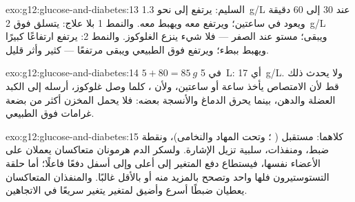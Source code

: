\begin{solution}{exo:g12:glucose-and-diabetes:13}
السليم: يرتفع  إلى نحو \qty{1.3}{g/L} عند 30 إلى 60 دقيقة
ويعود في ساعتين؛ ويرتفع  معه ويهبط معه. والنمط 1 بلا علاج:
يتسلق  فوق \qty{2}{g/L} ويبقى؛  مستو عند الصفر ---
فلا شيء ينزع الغلوكوز. والنمط 2: يرتفع  ارتفاعًا كبيرًا ويهبط
ببطء؛ ويرتفع  فوق الطبيعي ويبقى مرتفعًا ---  كثير وأثر
قليل.
\end{solution}

\begin{solution}{exo:g12:glucose-and-diabetes:14}
$5 + 80 = \qty{85}{g}$ في \qty{5}{L}: أي \qty{17}{g/L}. ولا يحدث ذلك
قط لأن الامتصاص يأخذ ساعة أو ساعتين، ولأن ، كلما وصل غلوكوز،
أرسله إلى  الكبد  العضلة والدهن، بينما يحرق الدماغ
والأنسجة بعضه: فلا يحمل المخزن أكثر من بضعة غرامات فوق الطبيعي.
\end{solution}

\begin{solution}{exo:g12:glucose-and-diabetes:15}
كلاهما: مستقبل ( ؛ وتحت المهاد والنخامى)، ونقطة ضبط،
ومنفذات،  سلبية تزيل الإشارة. ولسكر الدم هرمونان متعاكسان
يعملان على الأعضاء نفسها، فيستطاع دفع المتغير إلى أعلى وإلى أسفل
دفعًا فاعلًا؛ أما حلقة التستوستيرون فلها  واحد وتصحح بالمزيد منه
أو بالأقل غالبًا. والمنفذان المتعاكسان يعطيان ضبطًا أسرع وأضيق لمتغير
يتغير سريعًا في الاتجاهين.
\end{solution}

